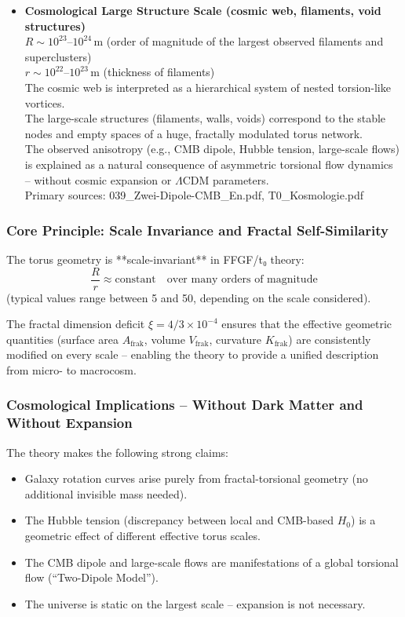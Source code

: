 \documentclass[12pt,a4paper]{article}
\begin{document}
\begin{itemize}
	\item \textbf{Cosmological Large Structure Scale (cosmic web, filaments, void structures)} \\
	$R \sim 10^{23}$–$10^{24}\,\text{m}$ (order of magnitude of the largest observed filaments and superclusters) \\
	$r \sim 10^{22}$–$10^{23}\,\text{m}$ (thickness of filaments) \\
	The cosmic web is interpreted as a hierarchical system of nested torsion-like vortices. \\
	The large-scale structures (filaments, walls, voids) correspond to the stable nodes and empty spaces of a huge, fractally modulated torus network. \\
	The observed anisotropy (e.g., CMB dipole, Hubble tension, large-scale flows) is explained as a natural consequence of asymmetric torsional flow dynamics – without cosmic expansion or $\Lambda$CDM parameters. \\
	Primary sources: 039\_Zwei-Dipole-CMB\_En.pdf, T0\_Kosmologie.pdf
\end{itemize}

\subsubsection{Core Principle: Scale Invariance and Fractal Self-Similarity}

The torus geometry is **scale-invariant** in FFGF/t₀ theory:
\[
\frac{R}{r} \approx \text{constant} \quad \text{over many orders of magnitude}
\]
(typical values range between 5 and 50, depending on the scale considered).

The fractal dimension deficit $\xi = 4/3 \times 10^{-4}$ ensures that the effective geometric quantities (surface area $A_{\text{frak}}$, volume $V_{\text{frak}}$, curvature $K_{\text{frak}}$) are consistently modified on every scale – enabling the theory to provide a unified description from micro- to macrocosm.

\subsubsection{Cosmological Implications – Without Dark Matter and Without Expansion}

The theory makes the following strong claims:
\begin{itemize}
	\item Galaxy rotation curves arise purely from fractal-torsional geometry (no additional invisible mass needed).
	\item The Hubble tension (discrepancy between local and CMB-based $H_0$) is a geometric effect of different effective torus scales.
	\item The CMB dipole and large-scale flows are manifestations of a global torsional flow (``Two-Dipole Model'').
	\item The universe is static on the largest scale – expansion is not necessary.
\end{itemize}
\end{document}
